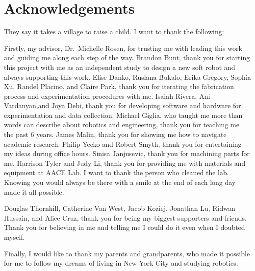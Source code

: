 \section*{Acknowledgements}

They say it takes a village to raise a child. I want to thank the following:

Firstly, my advisor, Dr.~Michelle Rosen, for trusting me with leading this work and guiding me along each step of the way. Brandon Bunt, thank you for starting this project with me as an independent study to design a new soft robot and always supporting this work. Elise Danko, Ruslana Bukalo, Erika Gregory, Sophia Xu, Randel Placino, and Claire Park, thank you for iterating the fabrication process and experimentation procedures with me. Isaiah Rivera, Ani Vardanyan,and Joya Debi, thank you for developing software and hardware for experimentation and data collection. Michael Giglia, who taught me more than words can describe about robotics and engineering, thank you for teaching me the past 6 years. James Malin, thank you for showing me how to navigate academic research. Philip Yecko and Robert Smyth, thank you for entertaining my ideas during office hours. Sinisa Janjusevic, thank you for machining parts for me. Harrison Tyler and Judy Li, thank you for providing me with materials and equipment at AACE Lab. I want to thank the person who cleaned the lab. Knowing you would always be there with a smile at the end of each long day made it all possible. 

Douglas Thornhill, Catherine Van West, Jacob Koziej, Jonathan Lu, Ridwan Hussain, and Alice Cruz, thank you for being my biggest supporters and friends. Thank you for believing in me and telling me I could do it even when I doubted myself.

Finally, I would like to thank my parents and grandparents, who made it possible for me to follow my dreams of living in New York City and studying robotics. 